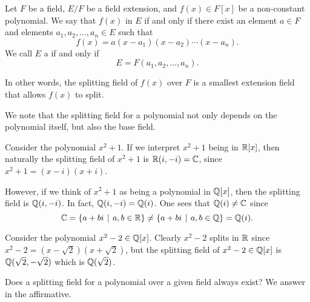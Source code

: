\begin{definition}
    Let $F$ be a field, $E/F$ be a field extension, and $f(x) \in F[x]$ be a non-constant polynomial. We say that $f(x)$  in $E$ if and only if there exist an element $a \in F$ and elements $a_1, a_2, \dots, a_n \in E$ such that
    \[
        f(x) = a(x-a_1)(x-a_2)\cdots(x-a_n).
    \]
    We call $E$ a  if and only if
    \[
        E = F(a_1, a_2, \dots, a_n).
    \]
\end{definition}
\begin{remark}
    In other words, the splitting field of $f(x)$ over $F$ is a smallest extension field that allows $f(x)$ to split.
\end{remark}

We note that the splitting field for a polynomial not only depends on the polynomial itself, but also the base field.

\begin{example}
    Consider the polynomial $x^2 + 1$. If we interpret $x^2 + 1$ being in $\mathbb{R}[x]$, then naturally the splitting field of $x^2 + 1$ is $\mathbb{R}(i, -i) = \mathbb{C}$, since $x^2 + 1 = (x-i)(x+i)$.

    However, if we think of $x^2+1$ as being a polynomial in $\mathbb{Q}[x]$, then the splitting field is $\mathbb{Q}(i, -i)$. In fact, $\mathbb{Q}(i, -i) = \mathbb{Q}(i)$. One sees that $\mathbb{Q}(i) \neq \mathbb{C}$ since
    \[
        \C = \{a + bi \vert a,b \in \R\} \neq \{a + bi \vert a,b \in \Q\} = \Q(i).
    \]
\end{example}

\begin{example}
    Consider the polynomial $x^2 - 2 \in \mathbb{Q}[x]$. Clearly $x^2 - 2$ splits in $\mathbb{R}$ since $x^2 - 2 = (x - \sqrt2)(x + \sqrt2)$, but the splitting field of $x^2 - 2 \in \mathbb{Q}[x]$ is $\mathbb{Q}(\sqrt2, -\sqrt2)$ which is $\mathbb{Q}(\sqrt 2)$.
\end{example}

Does a splitting field for a polynomial over a given field always exist? We answer in the affirmative.


